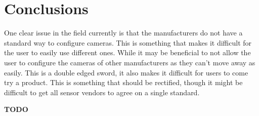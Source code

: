 \section{Conclusions}
One clear issue in the field currently is that the manufacturers do not have a
standard way to configure cameras. This is something that makes it difficult
for the user to easily use different ones. While it may be beneficial to not
allow the user to configure the cameras of other manufacturers as they can't
move away as easily. This is a double edged sword, it also makes it difficult
for users to come try a product. This is something that should be rectified,
though it might be difficult to get all sensor vendors to agree on a single
standard.

\textbf{TODO}
